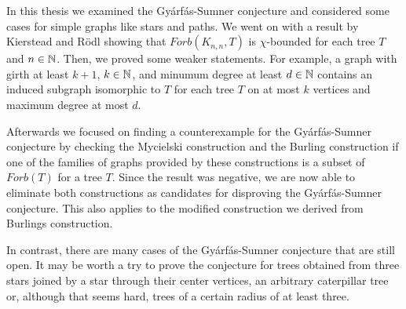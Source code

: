In this thesis we examined the Gyárfás-Sumner conjecture and considered some cases for simple graphs like stars and paths. We went on with a result by Kierstead and Rödl showing that $\textit{Forb}(K_{n,n},T)$ is $\chi$-bounded for each tree $T$ and $n\in\mathbb{N}$. Then, we proved some weaker statements. For example, a graph with girth at least $k+1$, $k\in\mathbb{N}$, and minumum degree at least $d\in\mathbb{N}$ contains an induced subgraph isomorphic to $T$ for each tree $T$ on at most $k$ vertices and maximum degree at most $d$.

Afterwards we focused on finding a counterexample for the Gyárfás-Sumner conjecture by checking the Mycielski construction and the Burling construction if one of the families of graphs provided by these constructions is a subset of $\textit{Forb}(T)$ for a tree $T$. Since the result was negative, we are now able to eliminate both constructions as candidates for disproving the Gyárfás-Sumner conjecture. This also applies to the modified construction we derived from Burlings construction.%

In contrast, there are many cases of the Gyárfás-Sumner conjecture that are still open. It may be worth a try to prove the conjecture for trees obtained from three stars joined by a star through their center vertices, an arbitrary caterpillar tree or, although that seems hard, trees of a certain radius of at least three.

